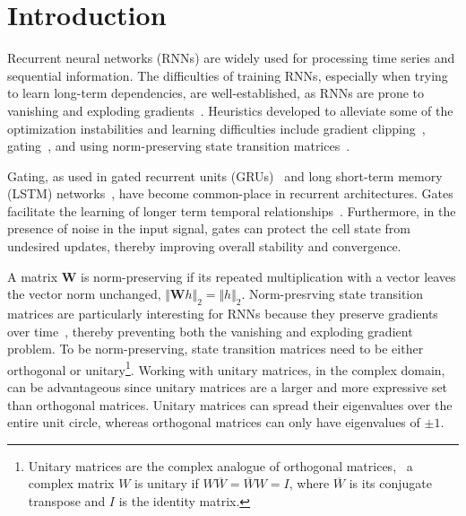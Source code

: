 \documentclass{article}
\begin{document}


\section{Introduction}
Recurrent neural networks (RNNs) are widely used for processing time series and sequential information.  The difficulties of training RNNs, especially when trying to learn long-term dependencies, are well-established, as RNNs are prone to vanishing and exploding gradients~\cite{bengio1994learning,Hochreiter,Pascanu}.  Heuristics developed to alleviate some of the optimization instabilities and learning difficulties include gradient clipping~\cite{goodfellow, Mikolov}, gating~\cite{cho-al-emnlp14,Hochreiter}, and using norm-preserving state transition matrices~\cite{Arjovsky, Hyland, Jing, Wisdom}.

Gating, as used in gated recurrent units (GRUs)~\cite{cho-al-emnlp14} and long short-term memory (LSTM) networks~\cite{Hochreiter}, have become common-place in recurrent architectures.  Gates facilitate the learning of longer term temporal relationships~\cite{Hochreiter}.  Furthermore, in the presence of noise in the input signal, gates can protect the cell state from undesired updates, thereby improving overall stability and convergence.

A matrix $\bm{W}$ is norm-preserving if its repeated multiplication with a vector leaves the vector norm unchanged, \ie $\Vert \bm{W} h\Vert_{2} = \Vert h \Vert_2$. 
Norm-presrving state transition matrices are particularly interesting for RNNs because they preserve gradients over time~\cite{Arjovsky}, thereby preventing both the vanishing and exploding gradient problem. To be norm-preserving, state transition matrices need to be either orthogonal or unitary\footnote{Unitary matrices are the complex analogue of orthogonal matrices, \ie~a complex matrix $W$ is unitary if $W \overline{W} = \overline{W} W = I$, where $\overline{W}$ is its conjugate transpose and $I$ is the identity matrix.}. Working with unitary matrices, in the complex domain, can be advantageous since unitary matrices are a larger and more expressive set than orthogonal matrices. Unitary matrices can spread their eigenvalues over the entire unit circle, whereas orthogonal matrices can only have eigenvalues of $\pm1$.  %
\end{document}
